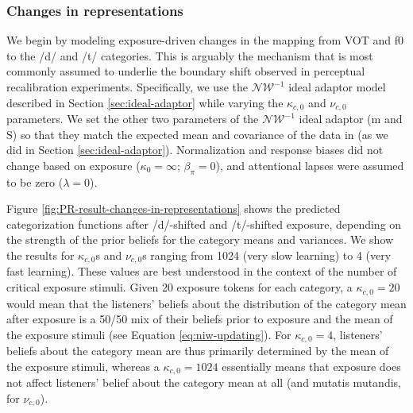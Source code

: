 \documentclass[
  11pt,
  man,floatsintext]{apa6}
\begin{document}
\hypertarget{changes-in-representations}{%
\subsubsection{Changes in representations}\label{changes-in-representations}}

We begin by modeling exposure-driven changes in the mapping from VOT and f0 to the /d/ and /t/ categories. This is arguably the mechanism that is most commonly assumed to underlie the boundary shift observed in perceptual recalibration experiments. Specifically, we use the \(\mathcal{NW}^{-1}\) ideal adaptor model described in Section \ref{sec:ideal-adaptor} while varying the \(\kappa_{c,0}\) and \(\nu_{c,0}\) parameters. We set the other two parameters of the \(\mathcal{NW}^{-1}\) ideal adaptor (\(\mathrm{m}\) and \(\mathrm{S}\)) so that they match the expected mean and covariance of the data in \textcite{chodroff-wilson2018} (as we did in Section \ref{sec:ideal-adaptor}). Normalization and response biases did not change based on exposure (\(\kappa_0 = \infty\); \(\beta_{\pi}=0\)), and attentional lapses were assumed to be zero (\(\lambda = 0\)).

Figure \ref{fig:PR-result-changes-in-representations} shows the predicted categorization functions after /d/-shifted and /t/-shifted exposure, depending on the strength of the prior beliefs for the category means and variances. We show the results for \(\kappa_{c,0}\)s and \(\nu_{c,0}\)s ranging from 1024 (very slow learning) to 4 (very fast learning). These values are best understood in the context of the number of critical exposure stimuli. Given 20 exposure tokens for each category, a \(\kappa_{c,0}=20\) would mean that the listeners' beliefs about the distribution of the category mean after exposure is a 50/50 mix of their beliefs prior to exposure and the mean of the exposure stimuli (see Equation \eqref{eq:niw-updating}). For \(\kappa_{c,0}=4\), listeners' beliefs about the category mean are thus primarily determined by the mean of the exposure stimuli, whereas a \(\kappa_{c,0}=1024\) essentially means that exposure does not affect listeners' belief about the category mean at all (and mutatis mutandis, for \(\nu_{c,0}\)).
\end{document}
